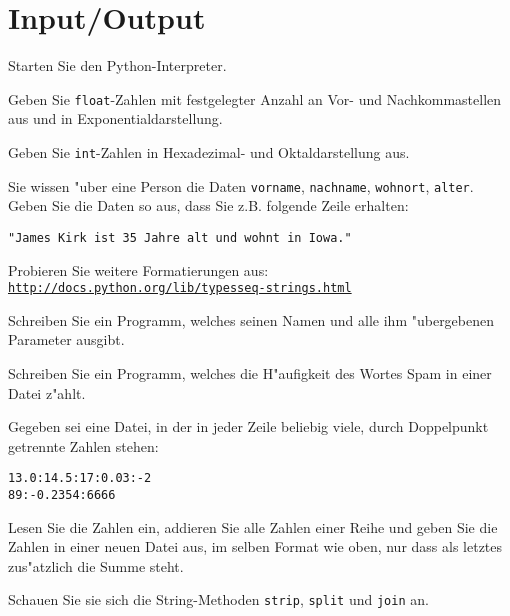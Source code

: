 \section*{Input/Output}
\begin{aufgabe}
Starten Sie den Python-Interpreter. 
\begin{auflistung}
\item Geben Sie \lstinline{float}-Zahlen mit festgelegter Anzahl an Vor- und Nachkommastellen aus und in Exponentialdarstellung.
\item Geben Sie \lstinline{int}-Zahlen in Hexadezimal- und Oktaldarstellung aus.
\item Sie wissen "uber eine Person die Daten \lstinline{vorname}, \lstinline{nachname}, \lstinline{wohnort}, \lstinline{alter}. Geben Sie die Daten so aus, dass Sie z.B. folgende Zeile erhalten: 
\begin{verbatim}
"James Kirk ist 35 Jahre alt und wohnt in Iowa."
\end{verbatim}
\item Probieren Sie weitere Formatierungen aus:\\ \texttt{\underline{http://docs.python.org/lib/typesseq-strings.html}}
\end{auflistung}
\end{aufgabe}

\begin{aufgabe}[Kommandozeilenparameter]
Schreiben Sie ein Programm, welches seinen Namen und alle ihm "ubergebenen Parameter ausgibt.
\end{aufgabe}

\begin{aufgabe}
Schreiben Sie ein Programm, welches die H"aufigkeit des Wortes \glqq Spam\grqq{} in einer Datei z"ahlt.
\end{aufgabe}

\begin{aufgabe}
Gegeben sei eine Datei, in der in jeder Zeile beliebig viele, durch Doppelpunkt getrennte Zahlen stehen:
\begin{verbatim}
13.0:14.5:17:0.03:-2
89:-0.2354:6666
\end{verbatim}
Lesen Sie die Zahlen ein, addieren Sie alle Zahlen einer Reihe und geben Sie die Zahlen in einer neuen Datei aus, im selben Format wie oben, nur dass als letztes zus"atzlich die Summe steht.

\hinweis Schauen Sie sie sich die String-Methoden \lstinline{strip}, \lstinline{split} und \lstinline{join} an.
\end{aufgabe}


